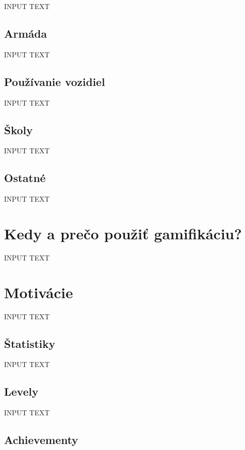 \documentclass[10pt,slovak,a4paper]{article}
\begin{document}
INPUT TEXT

\subsection{Armáda} \label{army}

INPUT TEXT

\subsection{Používanie vozidiel} \label{vehicle}

INPUT TEXT

\subsection{Školy} \label{school}

INPUT TEXT

\subsection{Ostatné} \label{other}

INPUT TEXT

\section{Kedy a prečo použiť gamifikáciu?} \label{Reason}

INPUT TEXT

\section{Motivácie} \label{Motivation}

INPUT TEXT

\subsection{Štatistiky} \label{statistics}

INPUT TEXT

\subsection{Levely} \label{levels}

INPUT TEXT

\subsection{Achievementy} \label{achievements}
\end{document}
